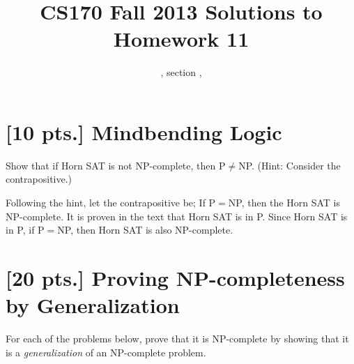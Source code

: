 \documentclass[11pt]{article}
\title{CS170  Fall 2013 Solutions to Homework 11}
\author{\Name, section \Sec, \texttt{\Login}}
\begin{document}
\maketitle

\section{[10 pts.] Mindbending Logic} 

Show that if Horn SAT is not NP-complete, then P$\neq$NP. 
(Hint: Consider the contrapositive.)

Following the hint, let the contrapositive be; If P$=$NP, then the Horn SAT 
is NP-complete. It is proven in the text that Horn SAT is in P. Since Horn SAT
is in P, if P$=$NP, then Horn SAT is also NP-complete. 

\label{pg:end-of-p1}
%

\newpage

\pagestyle{plain}

\section{[20 pts.] Proving NP-completeness by Generalization}

For each of the problems below, prove that it is NP-complete by showing that 
it is a \emph{generalization} of an NP-complete problem.
\end{document}
